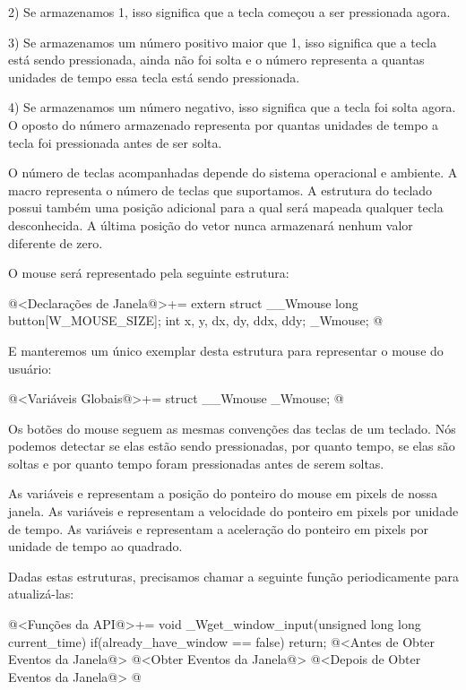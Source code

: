 2) Se armazenamos 1, isso significa que a tecla começou a ser
pressionada agora.

3) Se armazenamos um número positivo maior que 1, isso significa que a
tecla está sendo pressionada, ainda não foi solta e o número
representa a quantas unidades de tempo essa tecla está sendo
pressionada.

4) Se armazenamos um número negativo, isso significa que a tecla foi
solta agora. O oposto do número armazenado representa por quantas
unidades de tempo a tecla foi pressionada antes de ser solta.

O número de teclas acompanhadas depende do sistema operacional e
ambiente. A macro  representa o número
de teclas que suportamos. A estrutura do teclado possui também uma
posição adicional para a qual será mapeada qualquer tecla
desconhecida. A última posição do vetor nunca armazenará nenhum valor
diferente de zero.

O mouse será representado pela seguinte estrutura:

\iniciocodigo
@<Declarações de Janela@>+=
extern struct __Wmouse{
  long button[W_MOUSE_SIZE];
  int x, y, dx, dy, ddx, ddy;
} _Wmouse;
@
\fimcodigo

E manteremos um único exemplar desta estrutura para representar o
mouse do usuário:

\iniciocodigo
@<Variáveis Globais@>+=
struct __Wmouse _Wmouse;
@
\fimcodigo

Os botões do mouse seguem as mesmas convenções das teclas de um
teclado. Nós podemos detectar se elas estão sendo pressionadas, por
quanto tempo, se elas são soltas e por quanto tempo foram pressionadas
antes de serem soltas.

As variáveis  e  representam a posição do
ponteiro do mouse em pixels de nossa janela. As
variáveis  e  representam a velocidade
do ponteiro em pixels por unidade de tempo. As
variáveis  e  representam a aceleração
do ponteiro em pixels por unidade de tempo ao quadrado.

Dadas estas estruturas, precisamos chamar a seguinte função
periodicamente para atualizá-las:

\iniciocodigo
@<Funções da API@>+=
void _Wget_window_input(unsigned long long current_time){
  if(already_have_window == false)
    return;
  @<Antes de Obter Eventos da Janela@>
  @<Obter Eventos da Janela@>
  @<Depois de Obter Eventos da Janela@>
}
@
\fimcodigo

